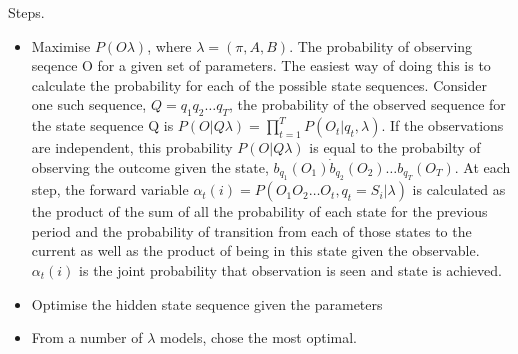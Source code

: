 \documentclass[12pt, a4paper, oneside]{article} %
\begin{document}
Steps. 
\begin{itemize}
\item Maximise $P(O \lambda)$, where $\lambda = (\pi, A, B)$.  The probability of observing seqence O for a given set of parameters.  The easiest way of doing this is to calculate the probability for each of the possible state sequences.  Consider one such sequence, $Q = q_1 q_2 \dots q_T$, the probability of the observed sequence for the state sequence Q is $P(O|Q \lambda) = \prod_{t = 1}^T P(O_t|q_t, \lambda)$.  If the observations are independent, this probability $P(O|Q \lambda)$ is equal to the probabilty of observing the outcome given the state, $b_{q_1}(O_1)\dot b_{q_2} (O_2) \dots b_{q_T}(O_T)$.  At each step, the forward variable $\alpha_t(i) = P(O_1 O_2 \dots O_t, q_t = S_i|\lambda)$ is calculated as the product of the sum of all the probability of each state for the previous period and the probability of transition from each of those states to the current as well as the product of being in this state given the observable. $\alpha_t(i)$ is the joint probability that observation is seen and state is achieved. 
\item Optimise the hidden state sequence given the parameters 
\item From a number of $\lambda$ models, chose the most optimal. 
\end{itemize}


\end{document}
